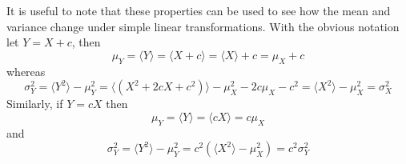 \documentclass[11pt,a4paper]{scrartcl}
\begin{document}
It is useful to note that these properties can be used to see how the
mean and variance change under simple linear transformations. With the
obvious notation let $Y=X+c$, then
\begin{equation}
\mu_Y=\langle Y\rangle =\langle X+c\rangle=\langle X \rangle +c=\mu_X+c
\end{equation}
whereas
\begin{equation}
\sigma^2_Y=\langle Y^2\rangle-\mu_Y^2=\langle(X^2+2cX+c^2)\rangle-\mu_X^2-2c\mu_X-c^2=\langle X^2\rangle -\mu_X^2=\sigma_X^2
\end{equation}
Similarly, if $Y=cX$ then
\begin{equation}
\mu_Y=\langle Y\rangle=\langle cX\rangle=c\mu_X
\end{equation}
and
\begin{equation}
\sigma_Y^2=\langle Y^2\rangle -\mu_Y^2=c^2(\langle X^2\rangle-\mu_X^2)=c^2\sigma_Y^2\end{equation}

\newpage


\end{document}
